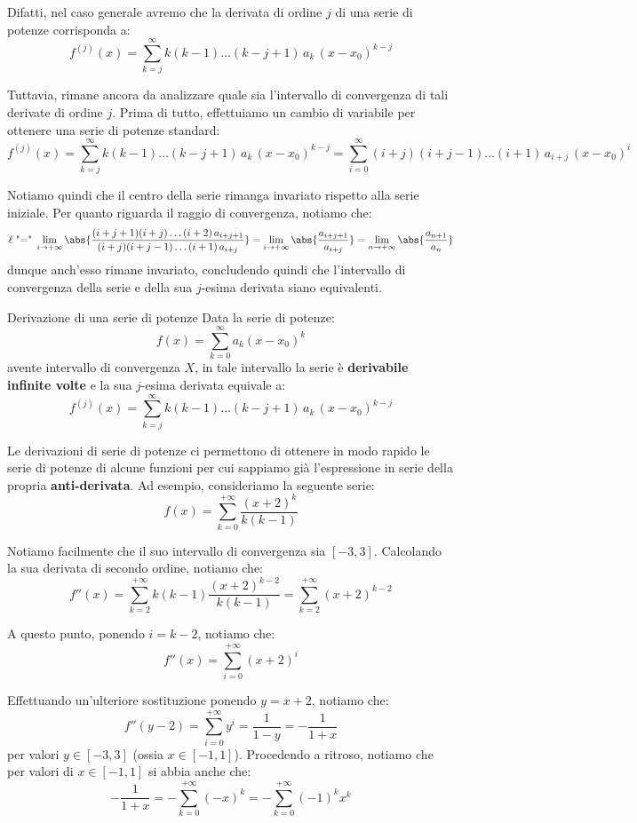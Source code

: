 \documentclass[a4paper, 12pt]{report}
\begin{document}
    Difatti, nel caso generale avremo che la derivata di ordine $j$ di una serie di potenze corrisponda a:
    \[f^{(j)}(x) = \sum_{k=j}^{\infty} k (k-1) \ldots (k-j+1) \, a_k \, (x-x_0)^{k-j}\]

    Tuttavia, rimane ancora da analizzare quale sia l'intervallo di convergenza di tali derivate di ordine $j$. Prima di tutto, effettuiamo un cambio di variabile per ottenere una serie di potenze standard:
    \[f^{(j)}(x) = \sum_{k=j}^{\infty} k (k-1) \ldots (k-j+1) \, a_k \, (x-x_0)^{k-j} = \sum_{i=0}^{\infty} (i+j)(i+j-1) \ldots (i+1) \, a_{i+j} \, (x-x_0)^{i}\]

    Notiamo quindi che il centro della serie rimanga invariato rispetto alla serie iniziale. Per quanto riguarda il raggio di convergenza, notiamo che:
    \[\ell \text{ "=" } \lim_{i \to +\infty} \abs{\frac{(i+j+1)(i+j) \ldots (i+2) \, a_{i+j+1}}{(i+j)(i+j-1) \ldots (i+1) \, a_{i+j}}} = \lim_{i \to +\infty} \abs{\frac{a_{i+j+1}}{a_{i+j}}} = \lim_{n \to +\infty} \abs{\frac{a_{n+1}}{a_{n}}}\]
    dunque anch'esso rimane invariato, concludendo quindi che l'intervallo di convergenza della serie e della sua $j$-esima derivata siano equivalenti.

    \begin{framedprop}{Derivazione di una serie di potenze}
        Data la serie di potenze:
        \[f(x) = \sum_{k=0}^{\infty} a_k (x-x_0)^k \]
        avente intervallo di convergenza $X$, in tale intervallo la serie è \textbf{derivabile infinite volte} e la sua $j$-esima derivata equivale a:
        \[f^{(j)}(x) = \sum_{k=j}^{\infty} k (k-1) \ldots (k-j+1) \, a_k \, (x-x_0)^{k-j}\]
    \end{framedprop}

    Le derivazioni di serie di potenze ci permettono di ottenere in modo rapido le serie di potenze di alcune funzioni per cui sappiamo già l'espressione in serie della propria \textbf{anti-derivata}. Ad esempio, consideriamo la seguente serie:
    \[f(x) = \sum_{k = 0}^{+\infty} \frac{(x+2)^k}{k(k-1)}\]

    Notiamo facilmente che il suo intervallo di convergenza sia $[-3, 3]$. Calcolando la sua derivata di secondo ordine, notiamo che:
    \[f''(x) = \sum_{k = 2}^{+\infty} k(k-1)\frac{(x+2)^{k-2}}{k(k-1)} =  \sum_{k = 2}^{+\infty} (x+2)^{k-2}\]

    A questo punto, ponendo $i = k-2$, notiamo che:
    \[f''(x) = \sum_{i = 0}^{+\infty} (x+2)^{i}\]
    
    Effettuando un'ulteriore sostituzione ponendo $y = x+2$, notiamo che:
    \[f''(y-2) = \sum_{i = 0}^{+\infty} y^{i} = \frac{1}{1-y} = - \frac{1}{1+x}\]
    per valori $y \in [-3, 3]$ (ossia $x \in [-1, 1]$). Procedendo a ritroso, notiamo che per valori di $x \in [-1, 1]$ si abbia anche che:
    \[-\frac{1}{1+x} = -\sum_{k = 0}^{+\infty} (-x)^{k} = -\sum_{k = 0}^{+\infty} (-1)^{k} x^k\]
\end{document}
